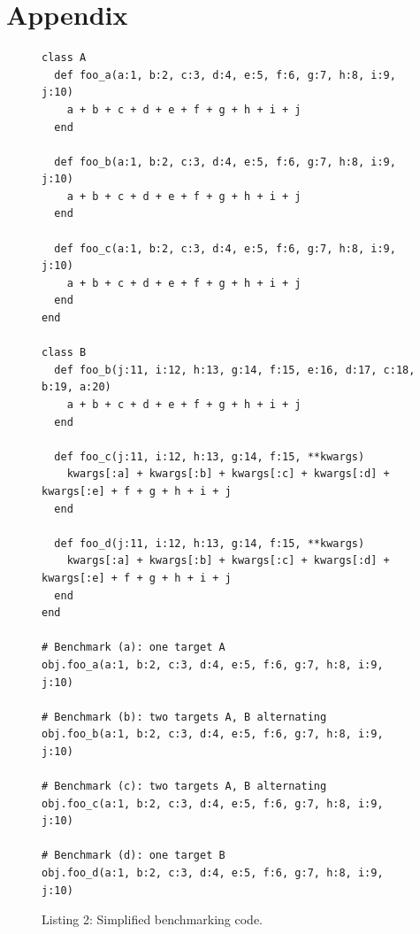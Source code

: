 \documentclass{sigplanconf} %
\begin{document}
\section{Appendix} %
\begin{figure}[!htp]
\begin{lstlisting}[basicstyle=\footnotesize\ttfamily] 
class A
  def foo_a(a:1, b:2, c:3, d:4, e:5, f:6, g:7, h:8, i:9, j:10)
    a + b + c + d + e + f + g + h + i + j
  end

  def foo_b(a:1, b:2, c:3, d:4, e:5, f:6, g:7, h:8, i:9, j:10)
    a + b + c + d + e + f + g + h + i + j
  end

  def foo_c(a:1, b:2, c:3, d:4, e:5, f:6, g:7, h:8, i:9, j:10)
    a + b + c + d + e + f + g + h + i + j
  end
end

class B
  def foo_b(j:11, i:12, h:13, g:14, f:15, e:16, d:17, c:18, b:19, a:20)
    a + b + c + d + e + f + g + h + i + j
  end

  def foo_c(j:11, i:12, h:13, g:14, f:15, **kwargs)
    kwargs[:a] + kwargs[:b] + kwargs[:c] + kwargs[:d] + kwargs[:e] + f + g + h + i + j
  end

  def foo_d(j:11, i:12, h:13, g:14, f:15, **kwargs)
    kwargs[:a] + kwargs[:b] + kwargs[:c] + kwargs[:d] + kwargs[:e] + f + g + h + i + j
  end
end

# Benchmark (a): one target A
obj.foo_a(a:1, b:2, c:3, d:4, e:5, f:6, g:7, h:8, i:9, j:10)

# Benchmark (b): two targets A, B alternating
obj.foo_b(a:1, b:2, c:3, d:4, e:5, f:6, g:7, h:8, i:9, j:10)

# Benchmark (c): two targets A, B alternating
obj.foo_c(a:1, b:2, c:3, d:4, e:5, f:6, g:7, h:8, i:9, j:10)

# Benchmark (d): one target B
obj.foo_d(a:1, b:2, c:3, d:4, e:5, f:6, g:7, h:8, i:9, j:10)
\end{lstlisting}
\caption*{Listing 2: Simplified benchmarking code.}
\end{figure}
%
%
\end{document}
